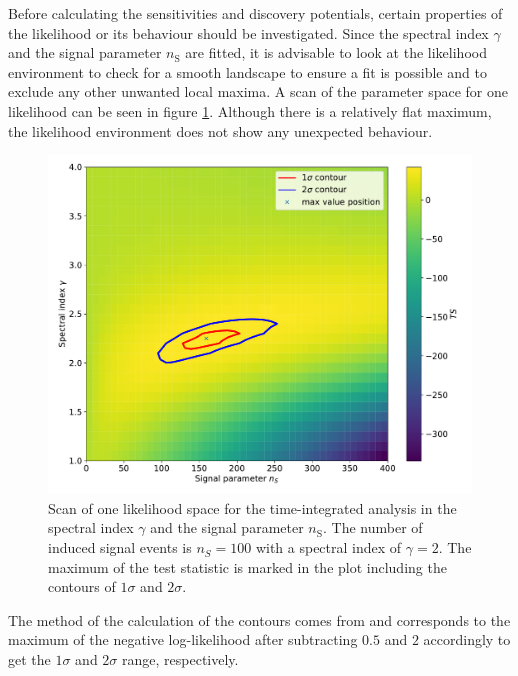 Before calculating the sensitivities and discovery potentials, certain properties of the likelihood or its behaviour should be investigated.
Since the spectral index $\gamma$ and the signal parameter $n_\text{S}$ are fitted, it is advisable to look at the likelihood environment to check for a smooth landscape to ensure a fit is possible and to exclude any other unwanted local maxima.
A scan of the parameter space for one likelihood can be seen in figure \ref{fig:llh_scan_time_int}.
Although there is a relatively flat maximum, the likelihood environment does not show any unexpected behaviour.
\begin{figure}
    \centering
    \includegraphics[width=\linewidth]{Plots/05_csky/llh_scan_time_int.pdf}
    \caption{Scan of one likelihood space for the time-integrated analysis in the spectral index $\gamma$ and the signal parameter $n_\text{S}$. The number of induced signal events is $n_S = \num{100}$ with a spectral index of $\gamma = 2$. The maximum of the test statistic is marked in the plot including the contours of $\num{1}\sigma$ and $\num{2}\sigma$.}
    \label{fig:llh_scan_time_int}
\end{figure}
The method of the calculation of the contours comes from \cite{Blobel} and corresponds to the maximum of the negative log-likelihood after subtracting $\num{0.5}$ and $\num{2}$ accordingly to get the $1\sigma$ and $2\sigma$ range, respectively.

